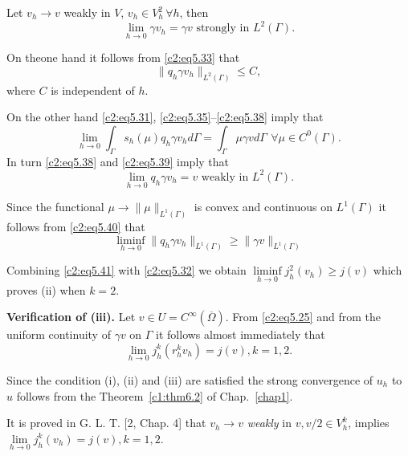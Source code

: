 Let $v_h \to v$ weakly in $V$, $v_h \in V^2_h\, \forall  h$, then  
\begin{equation}
\lim_{h \to 0} \gamma v_h = \gamma v \text{ strongly in } L^2
(\Gamma). \tag{5.37}\label{c2:eq5.37} 
\end{equation}

On the\pageoriginale  one hand it follows from \eqref{c2:eq5.33} that 
\begin{equation}
\parallel q_h \gamma v_h \parallel_{L^2 (\Gamma )} \leq C,\tag{5.38}\label{c2:eq5.38}
\end{equation}
where $C$ is independent of $h$.

On the other hand \eqref{c2:eq5.31},
\eqref{c2:eq5.35}--\eqref{c2:eq5.38} imply that  
\begin{equation}
\lim_{h \to 0} \int_\Gamma s_h (\mu) q_h \gamma v_h d \Gamma =
\int_\Gamma \mu \gamma v d \Gamma ~\, \forall  \mu \in C^0
(\Gamma). \tag{5.39}\label{c2:eq5.39} 
\end{equation}
In turn \eqref{c2:eq5.38} and \eqref{c2:eq5.39} imply that  
\begin{equation}
\lim_{h \to 0} q_h \gamma v_h = v \text{ weakly in } L^2 (\Gamma)
. \tag{5.40}\label{c2:eq5.40} 
\end{equation}

Since the functional $\mu \to \parallel  \mu \parallel_{L ^ 1(\Gamma)}$ is convex and
continuous on $L^1 (\Gamma)$ it follows from \eqref{c2:eq5.40} that  
\begin{equation}
\liminf_{ h \to 0 } \parallel  q_h \gamma v_h \parallel_{L^1 (\Gamma)} \geq \parallel  \gamma
v \parallel_{L^1 (\Gamma)} \tag{5.41}\label{c2:eq5.41} 
\end{equation}

Combining \eqref{c2:eq5.41} with \eqref{c2:eq5.32} we obtain
$\liminf\limits_{h \to 0}  j^2_h (v_h) \geq j (v)$ which proves (ii)
when $k = 2$.

\medskip
\noindent 
\textbf{Verification of (iii). }%
Let $v \in U = C^\infty (\overline{\Omega})$. From \eqref{c2:eq5.25} and
from the uniform continuity of $\gamma v$ on $\Gamma $ it follows
almost immediately that  
$$
\lim_{h \to 0} j^k_h (r^k_h v_h) = j(v), k=1, 2.
$$

Since the condition (i), (ii) and (iii) are satisfied the strong
convergence of $u_h$ to $u$ follows from the Theorem~\ref{c1:thm6.2}
of Chap.~\ref{chap1}.  

\begin{remark}\label{c2:rem5.8}%
It is proved in G. L. T. [2, Chap. 4] that $v_h \to v$ {\em weakly} in
$v, v/2 \in V^k_h$, implies $\displaystyle{\lim\limits_{h \to 0}} j^k_h (v_h) = j(v),
k=1, 2$.  
\end{remark}

